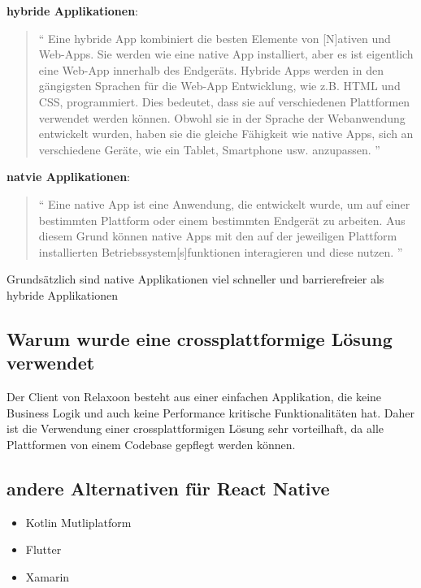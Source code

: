 \begin{spacing}{1}
    \textbf{hybride Applikationen}: \begin{quotation}
        ``
        Eine hybride App kombiniert die besten Elemente von [N]ativen und Web-Apps.
        Sie werden wie eine native App installiert, aber es ist eigentlich
        eine Web-App innerhalb des Endgeräts.
        Hybride Apps werden in den gängigsten Sprachen für die Web-App Entwicklung, wie z.B. HTML und CSS, programmiert. Dies bedeutet, dass sie auf verschiedenen Plattformen verwendet werden können.
        Obwohl sie in der Sprache der Webanwendung entwickelt wurden, haben sie die gleiche Fähigkeit wie native Apps, sich an verschiedene Geräte, wie ein Tablet, Smartphone usw. anzupassen.
        ''
        \cite{native-vs-hybrid}
    \end{quotation}
    \textbf{natvie Applikationen}: \begin{quotation}
        ``
        Eine native App ist eine Anwendung, die entwickelt wurde,
        um auf einer bestimmten Plattform oder einem bestimmten Endgerät zu arbeiten.
        Aus diesem Grund können native Apps mit den auf der jeweiligen Plattform
        installierten Betriebssystem[s]funktionen interagieren und diese nutzen.
        ''

        \cite{native-vs-hybrid}

    \end{quotation}

    Grundsätzlich sind native Applikationen  viel schneller und barrierefreier als hybride Applikationen
    \cite{native-vs-hybrid}


    \subsection{Warum wurde eine crossplattformige Lösung verwendet}
    Der Client von Relaxoon besteht aus einer einfachen Applikation, die keine Business Logik
    und auch keine Performance kritische Funktionalitäten hat.
    Daher ist die Verwendung einer crossplattformigen Lösung sehr vorteilhaft,
    da alle Plattformen von einem Codebase gepflegt werden können.

    \subsection{andere Alternativen für React Native}
    \begin{itemize}
        \item Kotlin Mutliplatform
        \item Flutter
        \item Xamarin
    \end{itemize}





\end{spacing}
